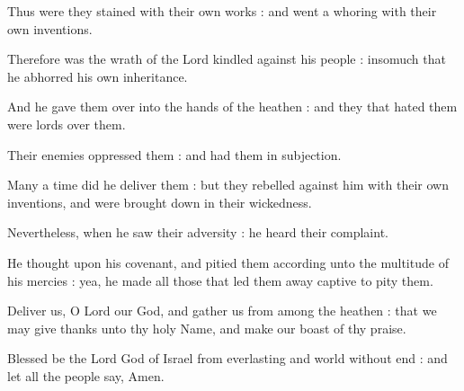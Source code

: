 Thus were they stained with their own works : and went a whoring with their own inventions.\par
{}Therefore was the wrath of the Lord kindled against his people : insomuch that he abhorred his own inheritance.\par
{}And he gave them over into the hands of the heathen : and they that hated them were lords over them.\par
{}Their enemies oppressed them : and had them in subjection.\par
{}Many a time did he deliver them : but they rebelled against him with their own inventions, and were brought down in their wickedness.\par
{}Nevertheless, when he saw their adversity : he heard their complaint.\par
{}He thought upon his covenant, and pitied them according unto the multitude of his mercies : yea, he made all those that led them away captive to pity them.\par
{}Deliver us, O Lord our God, and gather us from among the heathen : that we may give thanks unto thy holy Name, and make our boast of thy praise.\par
{}Blessed be the Lord God of Israel from everlasting and world without end : and let all the people say, Amen.\par



